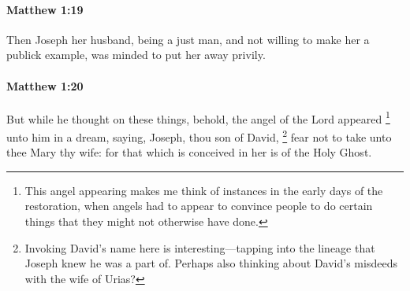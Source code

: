 		\paragraph{Matthew 1:19} %
			\label{MATTHEW-1-19}

			Then Joseph her husband, being a just man, and not willing to make her a publick example, was minded to put her away privily.

			\begin{framed}
			\scriptsize
				\begin{compactdesc}
					\item[SBLG] 
				\end{compactdesc}
			\end{framed}

		\paragraph{Matthew 1:20} %
			\label{MATTHEW-1-20}

			But while he thought on these things, behold, the angel of the Lord appeared%
				\footnote{%
					This angel appearing makes me think of instances in the early days of the restoration, when angels had to appear to convince people to do certain things that they might not otherwise have done.
					}
			unto him in a dream, saying, Joseph, thou son of David,%
				\footnote{%
					Invoking David's name here is interesting---tapping into the lineage that Joseph knew he was a part of. Perhaps also thinking about David's misdeeds with the wife of Urias?
					}
			fear not to take unto thee Mary thy wife: for that which is conceived in her is of the Holy Ghost.

